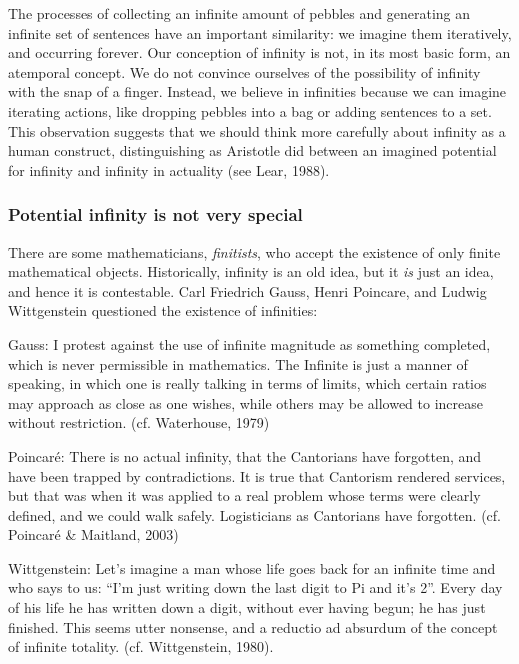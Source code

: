   The processes of collecting an infinite amount of pebbles and generating an infinite set of sentences have an important similarity: we imagine them iteratively, and occurring forever. Our conception of infinity is not, in its most basic form, an atemporal concept. We do not convince ourselves of the possibility of infinity with the snap of a finger. Instead, we believe in infinities because we can imagine iterating actions, like dropping pebbles into a bag or adding sentences to a set. This observation suggests that we should think more carefully about infinity as a human construct, distinguishing as Aristotle did between an imagined potential for infinity and infinity in actuality (see Lear, 1988).

\subsubsection{Potential infinity is not very special}

There are some mathematicians, \textit{finitists}, who accept the existence of only finite mathematical objects. Historically, infinity is an old idea, but it \textit{is} just an idea, and hence it is contestable. Carl Friedrich Gauss, Henri Poincare, and Ludwig Wittgenstein questioned the existence of infinities: 

Gauss: I protest against the use of infinite magnitude as something completed, which is never permissible in mathematics. The Infinite is just a manner of speaking, in which one is really talking in terms of limits, which certain ratios may approach as close as one wishes, while others may be allowed to increase without restriction. (cf. Waterhouse, 1979)

Poincaré: There is no actual infinity, that the Cantorians have forgotten, and have been trapped by contradictions. It is true that Cantorism rendered services, but that was when it was applied to a real problem whose terms were clearly defined, and we could walk safely. Logisticians as Cantorians have forgotten. (cf. Poincaré \& Maitland, 2003) 

Wittgenstein: Let's imagine a man whose life goes back for an infinite time and who says to us: “I'm just writing down the last digit to Pi and it's 2”. Every day of his life he has written down a digit, without ever having begun; he has just finished. This seems utter nonsense, and a reductio ad absurdum of the concept of infinite totality. (cf. Wittgenstein, 1980).

